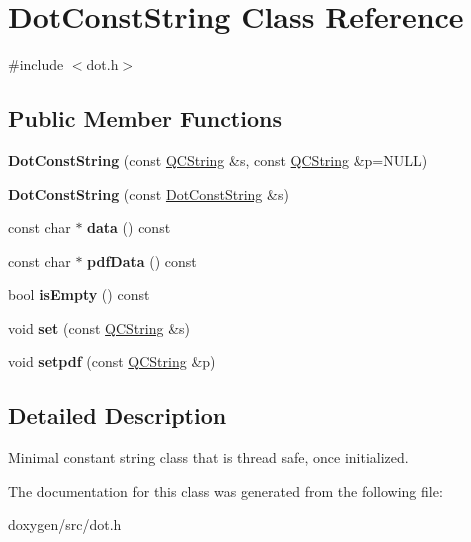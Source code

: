 \hypertarget{class_dot_const_string}{}\section{Dot\+Const\+String Class Reference}
\label{class_dot_const_string}


{\ttfamily \#include $<$dot.\+h$>$}

\subsection*{Public Member Functions}
\begin{DoxyCompactItemize}
\item 
\mbox{\label{class_dot_const_string_ad68a1d71566d3636bf55cd9fb0a4d2da}} 
{\bfseries Dot\+Const\+String} (const \mbox{\hyperlink{class_q_c_string}{Q\+C\+String}} \&s, const \mbox{\hyperlink{class_q_c_string}{Q\+C\+String}} \&p=N\+U\+LL)
\item 
\mbox{\label{class_dot_const_string_a1221e05983912b5bbf7bc1ad60a7319a}} 
{\bfseries Dot\+Const\+String} (const \mbox{\hyperlink{class_dot_const_string}{Dot\+Const\+String}} \&s)
\item 
\mbox{\label{class_dot_const_string_ad58024b6217c996aad625e4a46012a9d}} 
const char $\ast$ {\bfseries data} () const
\item 
\mbox{\label{class_dot_const_string_a5353081147f5bbc88467ef144ead0db5}} 
const char $\ast$ {\bfseries pdf\+Data} () const
\item 
\mbox{\label{class_dot_const_string_a29ed432ab1a2e2b410ce802f758eedf6}} 
bool {\bfseries is\+Empty} () const
\item 
\mbox{\label{class_dot_const_string_ad335e3d38a2bfa31e8ce79f1572f8ba1}} 
void {\bfseries set} (const \mbox{\hyperlink{class_q_c_string}{Q\+C\+String}} \&s)
\item 
\mbox{\label{class_dot_const_string_affbc394c668f79885df6d1108bf0fe6e}} 
void {\bfseries setpdf} (const \mbox{\hyperlink{class_q_c_string}{Q\+C\+String}} \&p)
\end{DoxyCompactItemize}


\subsection{Detailed Description}
Minimal constant string class that is thread safe, once initialized. 

The documentation for this class was generated from the following file\+:\begin{DoxyCompactItemize}
\item 
doxygen/src/dot.\+h\end{DoxyCompactItemize}
